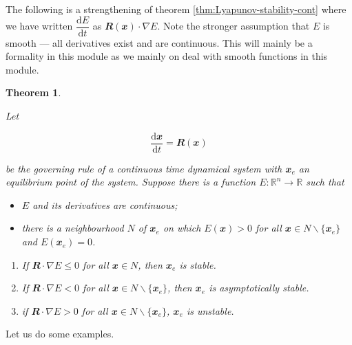 \documentclass[
  a4paper,
  oneside,
  final]{krantz}
\providecommand{\tightlist}{%
  \setlength{\itemsep}{0pt}\setlength{\parskip}{0pt}}
\newcommand{\R}{\mathbb{R}}
\renewcommand{\d}{\mathrm{d}}
\renewcommand{\v}[1]{{\mathbfit{#1}}}
\newcommand{\der}[2]{\dfrac{\d #1}{\d #2}}
\newtheorem{theorem}{Theorem}[chapter]
\theoremstyle{definition}
\theoremstyle{definition}
\theoremstyle{definition}
\theoremstyle{definition}
\theoremstyle{remark}
\begin{document}
The following is a strengthening of theorem \ref{thm:Lyapunov-stability-cont} where we have written \(\der{E}{t}\) as \(\v{R}(\v{x}) \cdot \nabla E\). Note the stronger assumption that \(E\) is smooth --- all derivatives exist and are continuous. This will mainly be a formality in this module as we mainly on deal with smooth functions in this module.

\begin{theorem}
\protect\hypertarget{thm:Lyapunov-stability-strong}{}\label{thm:Lyapunov-stability-strong}

Let

\[ \der{\v{x}}{t} = \v{R}(\v{x})\]

be the governing rule of a continuous time dynamical system with \(\v{x}_{e}\) an equilibrium point of the system.
Suppose there is a function \(E: \R^{n} \to \R\) such that

\begin{itemize}
\tightlist
\item
  \(E\) and its derivatives are continuous;
\item
  there is a neighbourhood \(N\) of \(\v{x}_{e}\) on which \(E(\v{x}) > 0\) for all \(\v{x} \in N \backslash \{\v{x}_{e}\}\) and \(E(\v{x}_e) = 0\).
\end{itemize}

\begin{enumerate}
\def\labelenumi{\roman{enumi}.}
\tightlist
\item
  If \(\v{R}\cdot \nabla E \le 0\) for all \(\v{x} \in N\), then \(\v{x}_e\) is stable.
\item
  If \(\v{R}\cdot \nabla E < 0\) for all \(\v{x} \in N \backslash \{\v{x}_{e}\}\), then \(\v{x}_e\) is asymptotically stable.
\item
  if \(\v{R}\cdot \nabla E >0\) for all \(\v{x} \in N \backslash \{\v{x}_{e}\}\), \(\v{x}_e\) is unstable.
\end{enumerate}

\end{theorem}

Let us do some examples.
\end{document}
